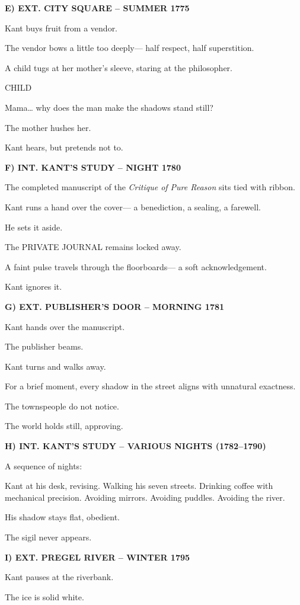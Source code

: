 \documentclass[12pt]{article}
\newenvironment{dialogue}[1]{%
  \vspace{0.8\baselineskip}%
  \noindent\hspace*{2.3in}\textsc{#1}\par%
  \noindent\hspace*{1.5in}\begin{minipage}[t]{4.5in}%
}{%
  \end{minipage}\par%
}
\begin{document}
\textbf{E) EXT. CITY SQUARE -- SUMMER 1775}

Kant buys fruit from a vendor.

The vendor bows a little too deeply—
half respect, half superstition.

A child tugs at her mother’s sleeve, staring at the philosopher.

\begin{dialogue}{CHILD}
Mama… why does the man make the shadows stand still?
\end{dialogue}

The mother hushes her.

Kant hears, but pretends not to.

\textbf{F) INT. KANT'S STUDY -- NIGHT 1780}

The completed manuscript of the \textit{Critique of Pure Reason}
sits tied with ribbon.

Kant runs a hand over the cover—
a benediction, a sealing, a farewell.

He sets it aside.

The PRIVATE JOURNAL remains locked away.

A faint pulse travels through the floorboards—
a soft acknowledgement.

Kant ignores it.

\textbf{G) EXT. PUBLISHER'S DOOR -- MORNING 1781}

Kant hands over the manuscript.

The publisher beams.

Kant turns and walks away.

For a brief moment, every shadow in the street
aligns with unnatural exactness.

The townspeople do not notice.

The world holds still, approving.

\textbf{H) INT. KANT’S STUDY -- VARIOUS NIGHTS (1782--1790)}

A sequence of nights:

Kant at his desk, revising.
Walking his seven streets.
Drinking coffee with mechanical precision.
Avoiding mirrors.
Avoiding puddles.
Avoiding the river.

His shadow stays flat, obedient.

The sigil never appears.

\textbf{I) EXT. PREGEL RIVER -- WINTER 1795}

Kant pauses at the riverbank.

The ice is solid white.
\end{document}
